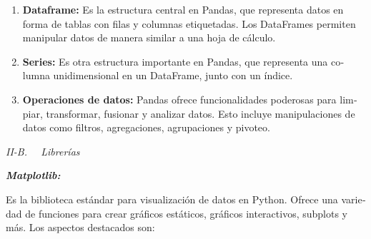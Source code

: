 \documentclass[letterpaper]{article}
\begin{document}
\begin{multicols}{2}
\bigskip

\begin{enumerate}[series=listWWNumiv,label=\Roman*.,ref=\Roman*]
\item {
\foreignlanguage{spanish}{\textbf{{Dataframe}}}\foreignlanguage{spanish}{\textbf{:}}\foreignlanguage{spanish}{
Es la estructura central en Pandas, que representa datos en forma de tablas con filas y columnas etiquetadas. Los
DataFrames permiten manipular datos de manera similar a una hoja de cálculo.}}
\item {
\foreignlanguage{spanish}{\textbf{{Series}}}\foreignlanguage{spanish}{\textbf{:}}\foreignlanguage{spanish}{
Es otra estructura importante en Pandas, que representa una columna unidimensional en un DataFrame, junto con un
índice.}}
\item {
\foreignlanguage{spanish}{\textbf{{Operaciones de
datos}}}\foreignlanguage{spanish}{\textbf{:}}\foreignlanguage{spanish}{ Pandas ofrece funcionalidades poderosas para
limpiar, transformar, fusionar y analizar datos. Esto incluye manipulaciones de datos como filtros, agregaciones,
agrupaciones y pivoteo.}}
\end{enumerate}

\bigskip


\bigskip


\bigskip


\bigskip


\bigskip


\bigskip


\bigskip


\bigskip


\bigskip


\bigskip

{
\textit{II-B. \ \ Librerías}}

{
\foreignlanguage{spanish}{\textbf{\textit{{Matplotlib}}}}\foreignlanguage{spanish}{\textbf{\textit{:}}}}

{
\foreignlanguage{spanish}{Es la biblioteca estándar para visualización de datos en Python. Ofrece una variedad de
funciones para crear gráficos estáticos, gráficos interactivos, subplots y más. }Los aspectos destacados son:}


\bigskip


\end{multicols}
\end{document}
